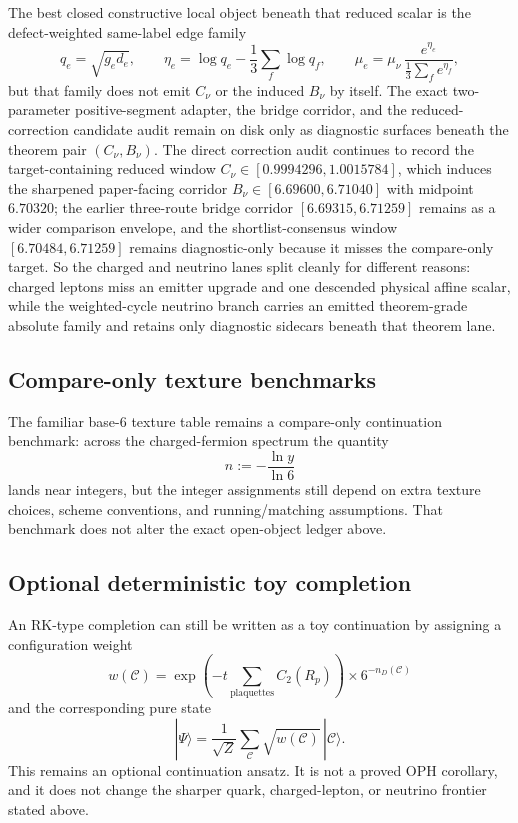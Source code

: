 The best closed constructive local object beneath that reduced scalar is the defect-weighted same-label edge family
\[
q_e=\sqrt{g_e d_e},
\qquad
\eta_e=\log q_e-\frac13\sum_f \log q_f,
\qquad
\mu_e=\mu_\nu\,\frac{e^{\eta_e}}{\frac13\sum_f e^{\eta_f}},
\]
but that family does not emit \(C_\nu\) or the induced \(B_\nu\) by itself. The exact two-parameter positive-segment adapter, the bridge corridor, and the reduced-correction candidate audit remain on disk only as diagnostic surfaces beneath the theorem pair \((C_\nu,B_\nu)\). The direct correction audit continues to record the target-containing reduced window \(C_\nu\in[0.9994296,1.0015784]\), which induces the sharpened paper-facing corridor \(B_\nu\in[6.69600,6.71040]\) with midpoint \(6.70320\); the earlier three-route bridge corridor \([6.69315,6.71259]\) remains as a wider comparison envelope, and the shortlist-consensus window \([6.70484,6.71259]\) remains diagnostic-only because it misses the compare-only target. So the charged and neutrino lanes split cleanly for different reasons: charged leptons miss an emitter upgrade and one descended physical affine scalar, while the weighted-cycle neutrino branch carries an emitted theorem-grade absolute family and retains only diagnostic sidecars beneath that theorem lane.

\subsection{Compare-only texture benchmarks}\label{123-the-yukawa-spectrum}

The familiar base-6 texture table remains a compare-only continuation benchmark: across the charged-fermion spectrum the quantity
\[
n:=-\frac{\ln y}{\ln 6}
\]
lands near integers, but the integer assignments still depend on extra texture choices, scheme conventions, and running/matching assumptions. That benchmark does not alter the exact open-object ledger above.

\subsection{Optional deterministic toy completion}\label{124-deterministic-completion-rk-hamiltonian}

An RK-type completion can still be written as a toy continuation by assigning a configuration weight
\[
w(\mathcal C)=\exp\!\left(-t\sum_{\text{plaquettes}}C_2(R_p)\right)\times 6^{-n_D(\mathcal C)}
\]
and the corresponding pure state
\[
|\Psi\rangle
=
\frac{1}{\sqrt Z}\sum_{\mathcal C}\sqrt{w(\mathcal C)}\,|\mathcal C\rangle.
\]
This remains an optional continuation ansatz. It is not a proved OPH corollary, and it does not change the sharper quark, charged-lepton, or neutrino frontier stated above.

